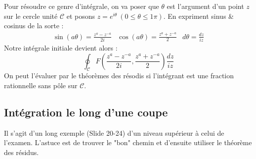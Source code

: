 Pour résoudre ce genre d'intégrale, on va poser que $\theta$ est l'argument d'un 
point $z$ sur le cercle unité $\mathcal{C}$ et posons $z=e^{i\theta}\ (0\leq \theta
\leq 1\pi)$. 
En expriment sinus \& cosinus de la sorte :
\begin{equation}
	\begin{array}{ccc}
		\sin(a\theta) = \frac{z^a-z^{-a}}{2i} & \cos(a\theta) = \frac{z^a+z^{-a}}{2} & d\theta 
		= \frac{dz}{iz}
	\end{array}
\end{equation}
Notre intégrale initiale devient alors :
\begin{equation}
	\oint_\mathcal{C}F\left(\frac{z^a-z^{-a}}{2i}, \frac{z^a+z^{-a}}{2} \right)\frac{dz}
	{iz}
\end{equation}
On peut l'évaluer par le théorèmes des résodis si l'intégrant est une fraction 
rationnelle sans pôle sur $\mathcal{C}$.
	
\subsection{Intégration le long d'une coupe}
Il s'agit d'un long exemple (Slide 20-24) d'un niveau supérieur à celui de l'examen.
L'astuce est de trouver le "bon" chemin et d'ensuite utiliser le théorème des 
résidus.


